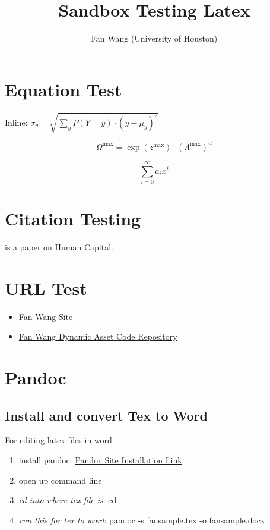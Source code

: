 \documentclass[]{article}
\title{Sandbox Testing Latex}
\author{Fan Wang (University of Houston)}
\date{}
\begin{document}
\maketitle

\hypertarget{equation-test}{%
\section{Equation Test}\label{equation-test}}

Inline:
\(\sigma_{y} = \sqrt{\sum_{y}^{}P(Y = y) \cdot \left( y - \mu_{y} \right)^{2}}\)

\[\Omega^{\max} = \exp(z^{\max}) \cdot \left( \Lambda^{\max} \right)^{\alpha}\]

\[\sum_{i = 0}^{\infty}a_{i}x^{i}\]

\hypertarget{citation-testing}{%
\section{Citation Testing}\label{citation-testing}}

is a paper on Human Capital.

\hypertarget{url-test}{%
\section{URL Test}\label{url-test}}

\begin{itemize}
\item
  \href{http://fanwangecon.github.io}{Fan Wang Site}
\item
  \href{https://fanwangecon.github.io/CodeDynaAsset/}{Fan Wang Dynamic
  Asset Code Repository}
\end{itemize}

\hypertarget{pandoc}{%
\section{Pandoc}\label{pandoc}}

\hypertarget{install-and-convert-tex-to-word}{%
\subsection{Install and convert Tex to
Word}\label{install-and-convert-tex-to-word}}

For editing latex files in word.

\begin{enumerate}
\def\labelenumi{\arabic{enumi}.}
\item
  install pandoc: \href{https://pandoc.org/installing.html}{Pandoc Site
  Installation Link}
\item
  open up command line
\item
  \emph{cd into where tex file is}: cd
\item
  \emph{run this for tex to word}: pandoc -s fansample.tex -o
  fansample.docx
\end{enumerate}
\end{document}
